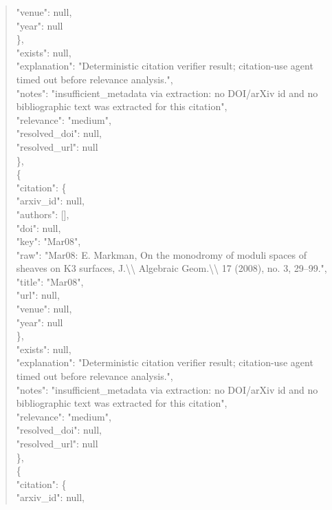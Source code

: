 \documentclass[11pt]{article}
\begin{document}
\begin{quote}
        "venue": null,\\
        "year": null\\
      \},\\
      "exists": null,\\
      "explanation": "Deterministic citation verifier result; citation-use agent timed out before relevance analysis.",\\
      "notes": "insufficient\_metadata via extraction: no DOI/arXiv id and no bibliographic text was extracted for this citation",\\
      "relevance": "medium",\\
      "resolved\_doi": null,\\
      "resolved\_url": null\\
    \},\\
    \{\\
      "citation": \{\\
        "arxiv\_id": null,\\
        "authors": [],\\
        "doi": null,\\
        "key": "Mar08",\\
        "raw": "Mar08: E. Markman, On the monodromy of moduli spaces of sheaves on K3 surfaces, J.\textbackslash{}\textbackslash{} Algebraic Geom.\textbackslash{}\textbackslash{} 17 (2008), no. 3, 29--99.",\\
        "title": "Mar08",\\
        "url": null,\\
        "venue": null,\\
        "year": null\\
      \},\\
      "exists": null,\\
      "explanation": "Deterministic citation verifier result; citation-use agent timed out before relevance analysis.",\\
      "notes": "insufficient\_metadata via extraction: no DOI/arXiv id and no bibliographic text was extracted for this citation",\\
      "relevance": "medium",\\
      "resolved\_doi": null,\\
      "resolved\_url": null\\
    \},\\
    \{\\
      "citation": \{\\
        "arxiv\_id": null,\\

\end{quote}
\end{document}
